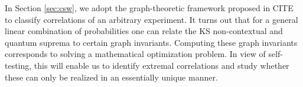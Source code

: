 In Section \ref{sec:csw}, we adopt the graph-theoretic framework proposed in CITE to classify correlations of an arbitrary experiment. It turns out that for a general linear combination of probabilities one can relate the KS non-contextual and quantum suprema to certain graph invariants. Computing these graph invariants corresponds to solving a mathematical optimization problem. In view of self-testing, this will enable us to identify extremal correlations and study whether these can only be realized in an essentially unique manner.